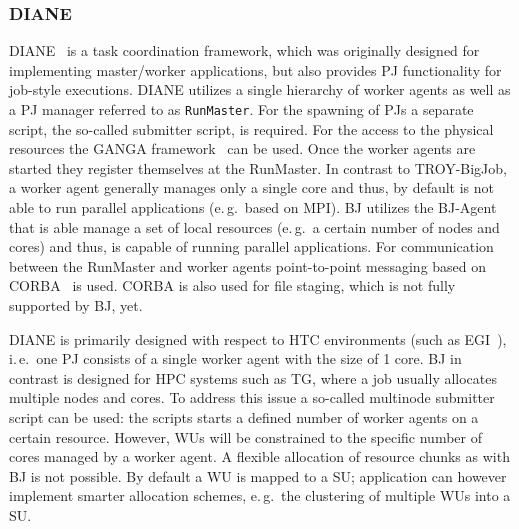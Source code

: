 \documentclass{sig-alternate}
\begin{document}

\subsubsection{DIANE}
DIANE~\cite{Moscicki:908910} is a task coordination framework, which
was originally designed for implementing master/worker applications,
but also provides PJ functionality for job-style executions. DIANE
utilizes a single hierarchy of worker agents as well as a PJ manager
referred to as \texttt{RunMaster}.
For the spawning of PJs a separate script, the so-called submitter script, is
required. For the access to the physical resources the GANGA
framework~\cite{Moscicki20092303} can be used.
Once the worker agents are started they register themselves at the RunMaster.
In contrast to TROY-BigJob, a worker agent generally manages only a single
core and thus, by default is not able to run parallel applications (e.\,g.\
based on MPI). BJ utilizes the BJ-Agent that is able manage a set of local
resources (e.\,g.\ a certain number of nodes and cores) and thus, is capable
of running parallel applications. For communication between the RunMaster and
worker agents point-to-point messaging based on CORBA~\cite{OMG-CORBA303:2004}
is used. CORBA is also used for file staging, which is not fully supported by
BJ, yet.

DIANE is primarily designed with respect to HTC environments (such as
EGI~\cite{egi}), i.\,e.\ one PJ consists of a single worker agent with the
size of 1 core. BJ in contrast is designed for HPC systems such as TG,
where a job usually allocates multiple nodes and cores. To address this issue
a so-called multinode submitter script can be used: the scripts starts a
defined number of worker agents on a certain resource. However, WUs will be
constrained to the specific number of cores managed by a worker agent. A
flexible allocation of resource chunks as with BJ is not possible. By
default a WU is mapped to a SU; application can however implement smarter
allocation schemes, e.\,g.\ the clustering of multiple WUs into a SU.
\end{document}
